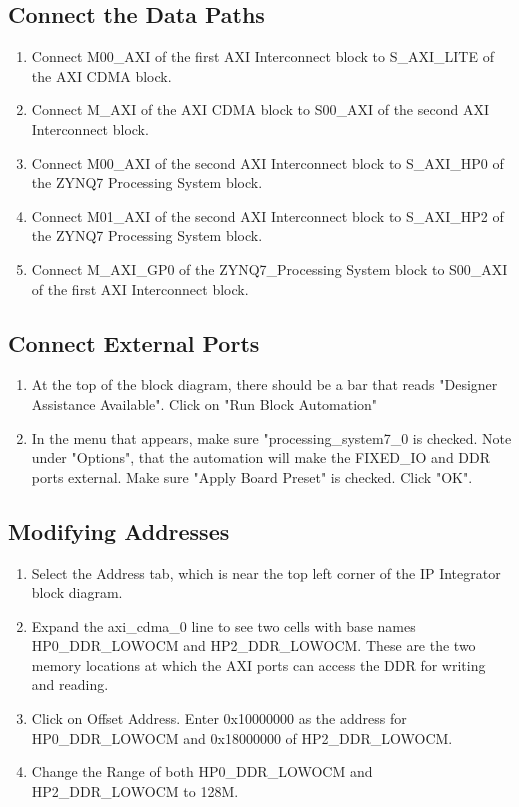 \documentclass[12pt]{article}
\begin{document}
\subsection{Connect the Data Paths}
\begin{enumerate}
\item Connect M00\_AXI of the first AXI Interconnect block to S\_AXI\_LITE of the AXI CDMA block.
\item Connect M\_AXI of the AXI CDMA block to S00\_AXI of the second AXI Interconnect block.
\item Connect M00\_AXI of the second AXI Interconnect block to S\_AXI\_HP0 of the ZYNQ7 Processing System block.
\item Connect M01\_AXI of the second AXI Interconnect block to S\_AXI\_HP2 of the ZYNQ7 Processing System block.
\item Connect M\_AXI\_GP0 of the ZYNQ7\_Processing System block to S00\_AXI of the first AXI Interconnect block.
\end{enumerate}

\subsection{Connect External Ports}
\begin{enumerate}
\item At the top of the block diagram, there should be a bar that reads "Designer Assistance Available".  Click on "Run Block Automation"
\item In the menu that appears, make sure "processing\_system7\_0 is checked.  Note under "Options", that the automation will make the FIXED\_IO and DDR ports external.  Make sure "Apply Board Preset" is checked.  Click "OK".
\end{enumerate}

\subsection{Modifying Addresses}
\begin{enumerate}
\item Select the Address tab, which is near the top left corner of the IP Integrator block diagram.
\item Expand the axi\_cdma\_0 line to see two cells with base names HP0\_DDR\_LOWOCM and HP2\_DDR\_LOWOCM.   These are the two memory locations at which the AXI ports can access the DDR for writing and reading.  
\item Click on Offset Address.  Enter 0x10000000 as the address for HP0\_DDR\_LOWOCM and 0x18000000 of HP2\_DDR\_LOWOCM.  
\item Change the Range of both HP0\_DDR\_LOWOCM and HP2\_DDR\_LOWOCM to 128M.
\end{enumerate}
\end{document}
